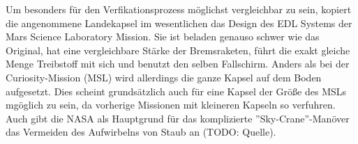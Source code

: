 Um besonders für den Verfikationsprozess möglichst vergleichbar zu sein, kopiert die angenommene Landekapsel im wesentlichen das Design des EDL Systems der Mars Science Laboratory Mission. Sie ist beladen genauso schwer wie das Original, hat eine vergleichbare Stärke der Bremsraketen, führt die exakt gleiche Menge Treibstoff mit sich und benutzt den selben Fallschirm. Anders als bei der Curiosity-Mission (MSL) wird allerdings die ganze Kapsel auf dem Boden aufgesetzt. Dies scheint grundsätzlich auch für eine Kapsel der Größe des MSLs mgöglich zu sein, da vorherige Missionen mit kleineren Kapseln so verfuhren. Auch gibt die NASA als Hauptgrund für das komplizierte ''Sky-Crane''-Manöver das Vermeiden des Aufwirbelns von Staub an (TODO: Quelle).